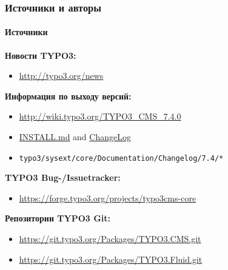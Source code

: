 \begin{frame}[fragile]
	\frametitle{Источники и авторы}
	\framesubtitle{Источники}

	\textbf{Новости TYPO3:}
		\begin{itemize}\smaller
			\item \url{http://typo3.org/news}
		\end{itemize}

	\textbf{Информация по выходу версий:}
		\begin{itemize}\smaller
			\item \url{http://wiki.typo3.org/TYPO3_CMS_7.4.0}
			\item \href{https://github.com/TYPO3/TYPO3.CMS/blob/master/INSTALL.md}{INSTALL.md} and \href{https://github.com/TYPO3/TYPO3.CMS/blob/master/ChangeLog}{ChangeLog}
			\item \texttt{typo3/sysext/core/Documentation/Changelog/7.4/*}
		\end{itemize}

	\textbf{TYPO3 Bug-/Issuetracker:}
		\begin{itemize}\smaller
			\item \url{https://forge.typo3.org/projects/typo3cms-core}
		\end{itemize}

	\textbf{Репозитории TYPO3 Git:}
		\begin{itemize}\smaller
			\item \url{https://git.typo3.org/Packages/TYPO3.CMS.git}
			\item \url{https://git.typo3.org/Packages/TYPO3.Fluid.git}
		\end{itemize}

\end{frame}



